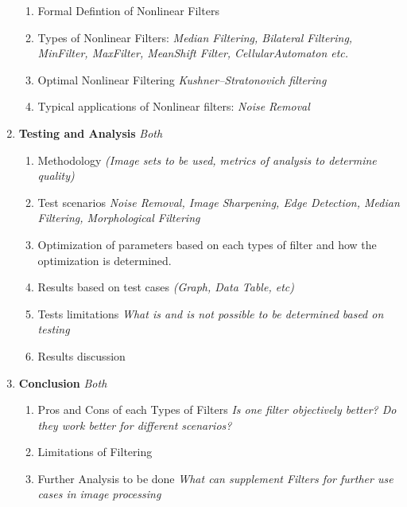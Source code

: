 \documentclass[titlepage]{article}
\begin{document}
\begin{enumerate}[label=\Roman*.]
            \begin{enumerate}[label=\arabic*.]
                \item Formal Defintion of Nonlinear Filters
                \item Types of Nonlinear Filters: \textit{Median Filtering, Bilateral Filtering, MinFilter, MaxFilter, MeanShift Filter, CellularAutomaton etc.}
                \item Optimal Nonlinear Filtering \textit{Kushner–Stratonovich filtering}
                \item Typical applications of Nonlinear filters: \textit{Noise Removal}
            \end{enumerate}
        \item \textbf{Testing and Analysis} \emph{Both}
            \begin{enumerate}[label=\arabic*.]
                \item Methodology \textit{(Image sets to be used, metrics of analysis to determine quality)}
                \item Test scenarios \textit{Noise Removal, Image Sharpening, Edge Detection, Median Filtering, Morphological Filtering}
                \item Optimization of parameters based on each types of filter and how the optimization is determined.
                \item Results based on test cases \textit{(Graph, Data Table, etc)}
                \item Tests limitations \textit{What is and is not possible to be determined based on testing}
                \item Results discussion
            \end{enumerate}
        \item \textbf{Conclusion} \emph{Both}
            \begin{enumerate}[label=\arabic*.]
                \item Pros and Cons of each Types of Filters \textit{Is one filter objectively better? Do they work better for different scenarios?}
                \item Limitations of Filtering
                \item Further Analysis to be done \textit{What can supplement Filters for further use cases in image processing}
            \end{enumerate}
    \end{enumerate}
    
\end{document}
